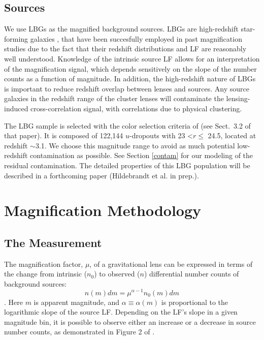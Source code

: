 
\subsection{Sources}
We use \ac{LBG}s as the magnified background sources. \ac{LBG}s are high-redshift star-forming galaxies \citep{Steidel98}, that have been succesfully employed in past magnification studies \citep[see][]{Hildebrandt09b, Hildebrandt11, Morrison12, Ford12} due to the fact that their redshift distributions and \ac{LF} are reasonably well understood. Knowledge of the intrinsic source \ac{LF} allows for an interpretation of the magnification signal, which depends sensitively on the slope of the number counts as a function of magnitude. In addition, the high-redshift nature of \ac{LBG}s is important to reduce redshift overlap between lenses and sources. Any source galaxies in the redshift range of the cluster lenses will contaminate the lensing-induced cross-correlation signal, with correlations due to physical clustering.

The \ac{LBG} sample is selected with the color selection criteria of \citet{Hildebrandt09a} (see Sect.~3.2 of that paper). It is composed of 122,144 $u$-dropouts with 23 \textless $r \leq$ 24.5, located at redshift $\sim$3.1. We choose this magnitude range to avoid as much potential low-redshift contamination as possible. See Section \ref{contam} for our modeling of the residual contamination. The detailed properties of this \ac{LBG} population will be described in a forthcoming paper (Hildebrandt et al. in prep.).


\section{Magnification Methodology}
\label{method}

\subsection{The Measurement}

The magnification factor, $\mu$, of a gravitational lens can be expressed in terms of the change from intrinsic ($n_0$) to observed ($n$) differential number counts of background sources:
\begin{equation}
n(m)dm = \mu^{\alpha-1} n_0(m)dm 
\end{equation}
\citep{Narayan89}. Here $m$ is apparent magnitude, and $\alpha \equiv \alpha(m)$ is proportional to the logarithmic slope of the source \ac{LF}. Depending on the \ac{LF}'s slope in a given magnitude bin, it is possible to observe either an increase or a decrease in source number counts, as demonstrated in Figure 2 of \citet{Ford12}. 

